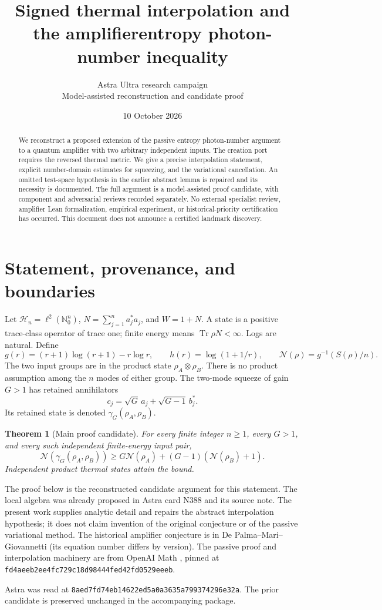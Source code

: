 \documentclass[11pt]{article}
\title{Signed thermal interpolation and the amplifier\newline entropy photon-number inequality}
\author{Astra Ultra research campaign\\Model-assisted reconstruction and candidate proof}
\date{10 October 2026}
\newcommand{\Tr}{\operatorname{Tr}}
\newcommand{\N}{\mathbb N}
\newcommand{\Hh}{\mathcal H}
\newtheorem{theorem}{Theorem}
\theoremstyle{remark}\newtheorem{remark}[theorem]{Remark}
\begin{document}
\maketitle
\begin{abstract}
We reconstruct a proposed extension of the passive entropy photon-number
argument to a quantum amplifier with two arbitrary independent inputs.
The creation port requires the reversed thermal metric. We give a precise
interpolation statement, explicit number-domain estimates for squeezing,
and the variational cancellation. An omitted test-space hypothesis in the
earlier abstract lemma is repaired and its necessity is documented.
The full argument is a model-assisted proof candidate, with component and
adversarial reviews recorded separately. No external specialist review,
amplifier Lean formalization, empirical experiment, or historical-priority
certification has occurred. This document does not announce a certified
landmark discovery.
\end{abstract}

\section{Statement, provenance, and boundaries}
Let $\Hh_n=\ell^2(\N_0^n)$, $N=\sum_{j=1}^n a_j^*a_j$, and $W=1+N$.
A state is a positive trace-class operator of trace one; finite energy means
$\Tr\rho N<\infty$. Logs are natural. Define
\[
 g(r)=(r+1)\log(r+1)-r\log r,\qquad
 h(r)=\log(1+1/r),\qquad
 \mathcal N(\rho)=g^{-1}(S(\rho)/n).
\]
The two input groups are in the product state $\rho_A\otimes\rho_B$.
There is no product assumption among the $n$ modes of either group.
The two-mode squeeze of gain $G>1$ has retained annihilators
\[
 c_j=\sqrt G\,a_j+\sqrt{G-1}\,b_j^*.
\]
Its retained state is denoted $\gamma_G(\rho_A,\rho_B)$.

\begin{theorem}[Main proof candidate]\label{thm:main}
For every finite integer $n\ge1$, every $G>1$, and every such independent
finite-energy input pair,
\begin{equation}\label{eq:main}
 \mathcal N(\gamma_G(\rho_A,\rho_B))
 \ge G\mathcal N(\rho_A)+(G-1)(\mathcal N(\rho_B)+1).
\end{equation}
Independent product thermal states attain the bound.
\end{theorem}

The proof below is the reconstructed candidate argument for this statement.
The local algebra was already proposed in Astra card N388 and its source
note. The present work supplies analytic detail and repairs the abstract
interpolation hypothesis; it does not claim invention of the original
conjecture or of the passive variational method. The historical amplifier
conjecture is in De Palma--Mari--Giovannetti \cite{DMG} (its equation number
differs by version). The passive proof and interpolation machinery are
from OpenAI Math \cite{OAI}, pinned at
\texttt{fd4aeeb2ee4fc729c18d98444fed42fd0529eeeb}\allowbreak.
\par Astra was read at \texttt{8aed7fd74eb14622ed5a0a3635a799374296e32a}.
The prior candidate is preserved unchanged in the accompanying package.
\end{document}
